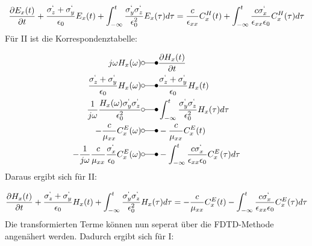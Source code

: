 \documentclass[11pt, ngerman]{article}
\begin{document}
\begin{align}
\frac{\partial E_x(t)}{\partial t} +\frac{\sigma^`_z + \sigma^`_y}{\epsilon_0}E_x(t) + \int_{-\infty}^t\frac{\sigma^`_y\sigma^`_z}{\epsilon_0^2}E_x(\tau)d\tau = \frac{c}{\epsilon_{xx}}C_x^H(t) + \int_{-\infty}^t \frac{c\sigma^`_x}{\epsilon_{xx}\epsilon_0}C_x^H(\tau)d\tau
\end{align}
F\"ur II ist die Korrespondenztabelle:

\begin{align}
	j\omega H_x(\omega) &\laplace \frac{\partial H_x(t)}{\partial t}\\
	\frac{\sgma_z + \sgma_y}{\epsilon_0}H_x(\omega) &\laplace \frac{\sgma_z + \sgma_y}{\epsilon_0}H_x(t)\\
	\frac{1}{j\omega}\frac{H_x(\omega)\sgma_y\sgma_z}{\epsilon_0^2} &\laplace \int_{-\infty}^t\frac{\sgma_y\sgma_z}{\epsilon_0^2}H_x(\tau)d\tau\\
	-\frac{c}{\mu_{xx}}C_x^E(\omega) &\laplace -\frac{c}{\mu_{xx}}C_x^E(t)\\
	-\frac{1}{j\omega}\frac{c}{\mu_{xx}}\frac{\sgma_x}{\epsilon_0}C_x^E(\omega) &\laplace -\int_{-\infty}^t \frac{c\sgma_x}{\epsilon_{xx}\epsilon_0}C_x^E(\tau)d\tau
\end{align}
Daraus ergibt sich f\"ur II:

\begin{align}
	\frac{\partial H_x(t)}{\partial t} + \frac{\sigma^`_z + \sigma^`_y}{\epsilon_0}H_x(t) + \int_{-\infty}^t\frac{\sigma^`_y\sigma^`_z}{\epsilon_0^2}H_x(\tau)d\tau = -\frac{c}{\mu_{xx}}C_x^E(t) - \int_{-\infty}^t \frac{c\sigma^`_x}{\epsilon_{xx}\epsilon_0}C_x^E(\tau)d\tau
\end{align}
Die transformierten Terme k\"onnen nun seperat \"uber die FDTD-Methode angen\"ahert werden.
\newpage
\noindent Dadurch ergibt sich f\"ur I:
\end{document}
